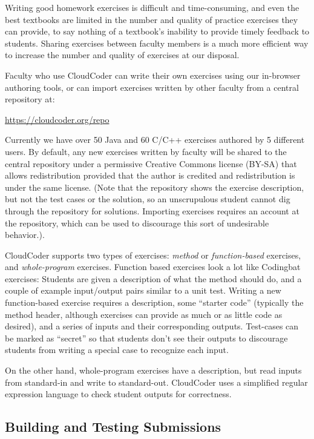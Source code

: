 \documentclass{sig-alternate}
\begin{document}
Writing good homework exercises is difficult and
time-consuming, and even the best textbooks are limited in the
number and quality of practice exercises they can provide, to say
nothing of a textbook's inability to provide timely feedback to
students.
Sharing exercises between faculty members is a much
more efficient way to increase the number and quality of exercises at
our disposal.

Faculty who use CloudCoder can write their own exercises using our in-browser
authoring tools, or can import exercises written by other faculty
from a central repository at:

\vspace*{3mm} 
\url{https://cloudcoder.org/repo}
\vspace*{3mm} 

Currently we have over 50 Java and 60 C/C++ exercises authored by 5
different users.  By default,
any new exercises written by faculty will be shared to the 
central repository under a permissive Creative Commons license (BY-SA)
that allows redistribution provided that the author is credited and
redistribution is under the same license.  
(Note that the repository shows the exercise description, but not the
test cases or the solution, so an unscrupulous student cannot dig through the
repository for solutions.  Importing exercises requires an account at
the repository, which can be used to discourage this sort of
undesirable behavior.).

CloudCoder supports two types of exercises:  {\em method} or {\em function-based}
exercises, and {\em whole-program} exercises.  Function based exercises look
a lot like Codingbat exercises:  Students are given a description of
what the method should do, and a couple of example input/output pairs
similar to a unit test.  Writing a new function-based exercise
requires a description, some ``starter code'' (typically the method
header, although exercises can provide as much or as little code as
desired), and a series of inputs and their corresponding outputs.
Test-cases can be marked as ``secret'' so that students don't see their
outputs to discourage students from writing a special case to
recognize each input.

On the other hand, whole-program exercises
have a description, but read inputs from
standard-in and write to standard-out.  CloudCoder uses a
simplified regular expression language to check student outputs for
correctness.


\subsection{Building and Testing Submissions}
\end{document}

